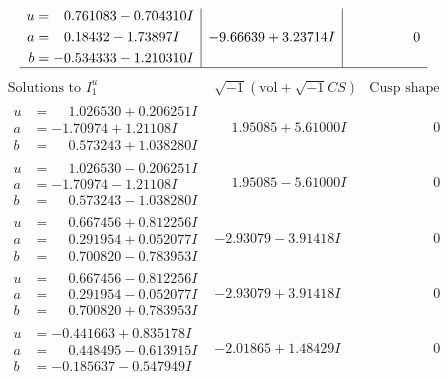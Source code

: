 \documentclass[1p]{elsarticle_modified}
\theoremstyle{definition}
\newcommand{\I}{\sqrt{-1}}
\begin{document}
$$\begin{array}{c|c|c}
\begin{aligned}
u &= \phantom{-}0.761083 - 0.704310 I \\
a &= \phantom{-}0.18432 - 1.73897 I \\
b &= -0.534333 - 1.210310 I\end{aligned}
 & -9.66639 + 3.23714 I & \phantom{-0.000000 } 0\\
 \hline 
 \end{array}$$\newpage$$\begin{array}{c|c|c}  
\text{Solutions to }I^u_{1}& \I (\text{vol} + \sqrt{-1}CS) & \text{Cusp shape}\\
 \hline 
\begin{aligned}
u &= \phantom{-}1.026530 + 0.206251 I \\
a &= -1.70974 + 1.21108 I \\
b &= \phantom{-}0.573243 + 1.038280 I\end{aligned}
 & \phantom{-}1.95085 + 5.61000 I & \phantom{-0.000000 } 0 \\ \hline\begin{aligned}
u &= \phantom{-}1.026530 - 0.206251 I \\
a &= -1.70974 - 1.21108 I \\
b &= \phantom{-}0.573243 - 1.038280 I\end{aligned}
 & \phantom{-}1.95085 - 5.61000 I & \phantom{-0.000000 } 0 \\ \hline\begin{aligned}
u &= \phantom{-}0.667456 + 0.812256 I \\
a &= \phantom{-}0.291954 + 0.052077 I \\
b &= \phantom{-}0.700820 - 0.783953 I\end{aligned}
 & -2.93079 - 3.91418 I & \phantom{-0.000000 } 0 \\ \hline\begin{aligned}
u &= \phantom{-}0.667456 - 0.812256 I \\
a &= \phantom{-}0.291954 - 0.052077 I \\
b &= \phantom{-}0.700820 + 0.783953 I\end{aligned}
 & -2.93079 + 3.91418 I & \phantom{-0.000000 } 0 \\ \hline\begin{aligned}
u &= -0.441663 + 0.835178 I \\
a &= \phantom{-}0.448495 - 0.613915 I \\
b &= -0.185637 - 0.547949 I\end{aligned}
 & -2.01865 + 1.48429 I & \phantom{-0.000000 } 0 \\ \hline\begin{aligned}

\end{aligned}
\end{array}$$
\end{document}
